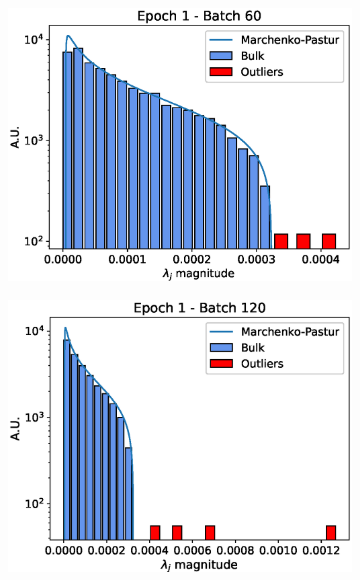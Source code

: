 \documentclass[notitlepage]{revtex4-1}
\begin{document}
\begin{figure}
\begin{subfigure}{.32\linewidth}
    \caption{}
    \label{fig:sv1}
  \end{subfigure}
  \begin{subfigure}{.32\linewidth}
    \includegraphics[width=\linewidth]{sv_distr_e1_b60.eps}
    \caption{}
    \label{fig:sv2}
  \end{subfigure}\par\medskip
  \begin{subfigure}{.32\linewidth}
    \includegraphics[width=\linewidth]{sv_distr_e1_b120.eps}
    \caption{} 
    \label{fig:sv3}
  \end{subfigure}
  \begin{subfigure}{.64\linewidth}

\end{subfigure}
\end{figure}
\end{document}
